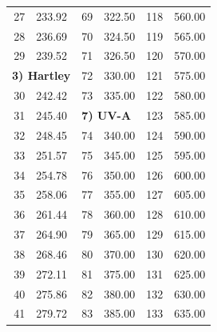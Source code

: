 \documentclass[a4paper,twoside]{article}
\begin{document}
\begin{table}[tbh]
\begin{center}
\begin{tabular}{|rp{}|rp{}|rp{}|}
       27 & 233.92                                &  69 & 322.50                      & 118 & 560.00                          \\
       28 & 236.69                                &  70 & 324.50                      & 119 & 565.00                          \\
       29 & 239.52                                &  71 & 326.50                      & 120 & 570.00                          \\\cline{1-2}
      \multicolumn{2}{|l|}{\bf 3) Hartley}        &  72 & 330.00                      & 121 & 575.00                          \\\cline{1-2}
       30 & 242.42                                &  73 & 335.00                      & 122 & 580.00                          \\\cline{3-4}
       31 & 245.40                                & \multicolumn{2}{|l|}{\bf 7) UV-A} & 123 & 585.00                          \\\cline{3-4}
       32 & 248.45                                &  74 & 340.00                      & 124 & 590.00                          \\
       33 & 251.57                                &  75 & 345.00                      & 125 & 595.00                          \\
       34 & 254.78                                &  76 & 350.00                      & 126 & 600.00                          \\
       35 & 258.06                                &  77 & 355.00                      & 127 & 605.00                          \\
       36 & 261.44                                &  78 & 360.00                      & 128 & 610.00                          \\
       37 & 264.90                                &  79 & 365.00                      & 129 & 615.00                          \\
       38 & 268.46                                &  80 & 370.00                      & 130 & 620.00                          \\
       39 & 272.11                                &  81 & 375.00                      & 131 & 625.00                          \\
       40 & 275.86                                &  82 & 380.00                      & 132 & 630.00                          \\
       41 & 279.72                                &  83 & 385.00                      & 133 & 635.00                          \\

\end{tabular}
\end{center}
\end{table}
\end{document}

